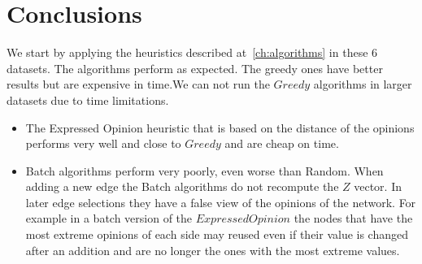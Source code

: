 \chapter{Conclusions}
\label{ch:conclusions}

\noindent We start by applying the heuristics described at~\ref{ch:algorithms} in these 6 datasets. The algorithms perform as expected. The greedy ones have better results but are expensive in time.We can not run the $Greedy$ algorithms in larger datasets due to time limitations.

\begin{itemize}
  \item The Expressed Opinion heuristic that is based on the distance of the opinions performs very well and close to $Greedy$ and are cheap on time.
  \item Batch algorithms perform very poorly, even worse than Random. When adding a new edge the Batch algorithms do not recompute the $Z$ vector. In later edge selections they have a false view of the opinions of the network. For example in a batch version of the $ExpressedOpinion$ the nodes that have the most extreme opinions of each side may reused even if their value is changed after an addition and are no longer the ones with the most extreme values.
 \end{itemize}


